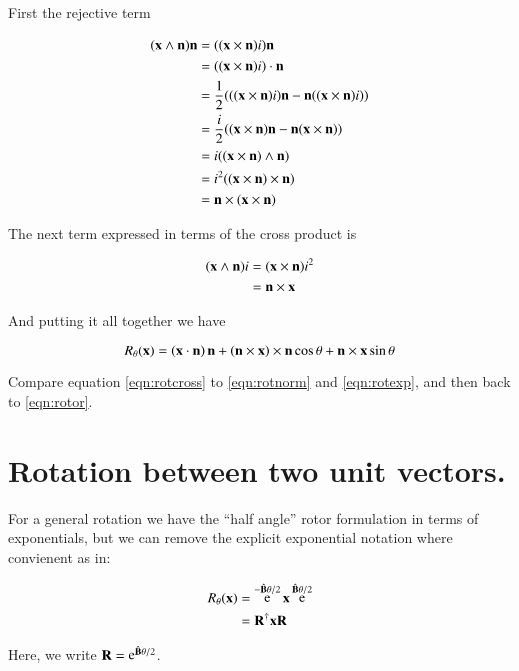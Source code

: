 \documentclass{article}      %
\DeclareMathOperator{\Exp}{e}
\begin{document}
First the rejective term

\begin{align*}
(\mathbf{x} \wedge \mathbf{n}) \mathbf{n} 
&= ((\mathbf{x} \times \mathbf{n}) i) \mathbf{n} \\
&= ((\mathbf{x} \times \mathbf{n}) i) \cdot \mathbf{n} \\
&= \frac{1}{2} ( ((\mathbf{x} \times \mathbf{n}) i) \mathbf{n} - \mathbf{n} ((\mathbf{x} \times \mathbf{n}) i)) \\
&= \frac{i}{2} ( (\mathbf{x} \times \mathbf{n}) \mathbf{n} - \mathbf{n} (\mathbf{x} \times \mathbf{n}) ) \\
&= i ( (\mathbf{x} \times \mathbf{n}) \wedge \mathbf{n} ) \\
&= i^2 ( (\mathbf{x} \times \mathbf{n}) \times \mathbf{n} ) \\
&= \mathbf{n} \times (\mathbf{x} \times \mathbf{n}) \\
\end{align*}

The next term expressed in terms of the cross product is

\begin{align*}
(\mathbf{x} \wedge \mathbf{n}) i
&=
(\mathbf{x} \times \mathbf{n}) i^2 \\
&= \mathbf{n} \times \mathbf{x} \\
\end{align*}

And putting it all together we have

\begin{equation}\label{eqn:rotcross}
R_\theta(\mathbf{x}) =
\left(\mathbf{x} \cdot \mathbf{n}\right) \mathbf{n} 
 + \left(\mathbf{n} \times \mathbf{x}\right) \times \mathbf{n} \cos\theta 
 + \mathbf{n} \times \mathbf{x} \sin\theta 
\end{equation}

Compare equation \ref{eqn:rotcross} to \ref{eqn:rotnorm} and \ref{eqn:rotexp}, and then back to \ref{eqn:rotor}.

\section{ Rotation between two unit vectors. }

For a general rotation we have the ``half angle'' rotor formulation in terms of exponentials, but we can remove the explicit 
exponential notation where convienent as in:

\begin{align*}
R_\theta(\Bx) 
&= \Exp^{-\hat{\BB}\theta/2} \Bx \Exp^{\hat{\BB}\theta/2} \\
&= \BR^\dagger \Bx \BR \\
\end{align*}

Here, we write $\BR = \Exp^{\hat{\BB}\theta/2}$.  
\end{document}
